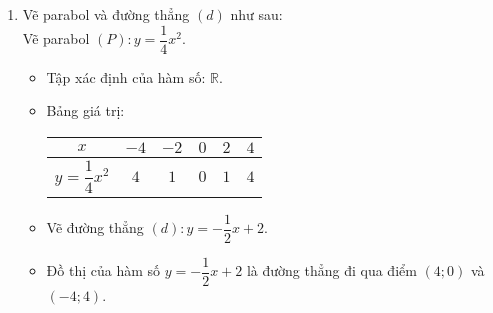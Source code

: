 \begin{ex}
{\begin{enumerate}
		Khi đó hệ phương trình đã cho trở thành:  \\$ \begin{cases} 108u - 63v = 7\\ 81u -84v = 7 \end{cases} \Leftrightarrow \begin{cases} 108u-63v=81u-84v\\ 81u-84v =7  \end{cases} \Leftrightarrow \begin{cases} 27u=-21v\\ 81u-84v =7  \end{cases} \Leftrightarrow \begin{cases} u = \dfrac{1}{27}\\ v= \dfrac{-1}{21}. \end{cases} $ \\
		Với $ \begin{cases} u = \dfrac{1}{27}\\ v =\dfrac{-1}{21} \end{cases}$ thì $ \begin{cases} x= 27\\ y=-21. \end{cases}$\\
		Vậy hệ phương trình đã cho có nghiệm là: $ (x;y) = (27;-21) $
		\item Vẽ parabol và đường thẳng $ (d) $ như sau:\\
		Vẽ parabol $ (P): y = \dfrac{1}{4}x^2 $.\\
		\begin{itemize}
		\item Tập xác định của hàm số: $ \mathbb{R} .$
		\item Bảng giá trị:
		
	\begin{tabular}{|c|c|c|c|c|c|} \hline  
			$x$& $-4$&$ -2 $&$ 0 $&$ 2$&$4$\\ \hline 
			$ y = \dfrac{1}{4}x^2 $&$4$  & $1$	&$0$ &$1$ &$4$ \\ \hline	
	\end{tabular}
\item Vẽ đường thẳng $ (d): y =-\dfrac{1}{2}x +2. $
\item Đồ thị của hàm số $ y=-\dfrac{1}{2}x +2 $ là đường thẳng đi qua điểm $ (4;0) $ và $ (-4;4) $.
\end{itemize}
	\begin{center}
\end{center}
\end{enumerate}}
\end{ex}
